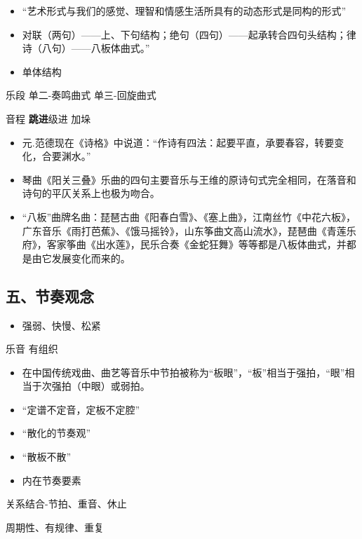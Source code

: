 \documentclass[
]{article}
\providecommand{\tightlist}{%
  \setlength{\itemsep}{0pt}\setlength{\parskip}{0pt}}
\begin{document}
\begin{itemize}
\tightlist
\item
  ``艺术形式与我们的感觉、理智和情感生活所具有的动态形式是同构的形式''
\item
  对联（两句）------上、下句结构；绝句（四句）------起承转合四句头结构；律诗（八句）------八板体曲式。''
\item
  单体结构
\end{itemize}

乐段 单二-奏鸣曲式 单三-回旋曲式

音程 \textbf{跳进}级进 加垛

\begin{itemize}
\tightlist
\item
  元.范德现在《诗格》中说道：``作诗有四法：起要平直，承要春容，转要变化，合要渊水。''
\item
  琴曲《阳关三叠》乐曲的四句主要音乐与王维的原诗句式完全相同，在落音和诗句的平仄关系上也极为吻合。
\item
  ``八板''曲牌名曲：琵琶古曲《阳春白雪》、《塞上曲》，江南丝竹《中花六板》，广东音乐《雨打芭蕉》、《饿马摇铃》，山东筝曲文高山流水》，琵琶曲《青莲乐府》，客家筝曲《出水莲》，民乐合奏《金蛇狂舞》等等都是八板体曲式，并都是由它发展变化而来的。
\end{itemize}

\subsection{五、节奏观念}\label{ux4e94ux8282ux594fux89c2ux5ff5}

\begin{itemize}
\tightlist
\item
  强弱、快慢、松紧
\end{itemize}

乐音 有组织

\begin{itemize}
\tightlist
\item
  在中国传统戏曲、曲艺等音乐中节拍被称为``板眼''，``板''相当于强拍，``眼''相当于次强拍（中眼）或弱拍。
\item
  ``定谱不定音，定板不定腔''
\item
  ``散化的节奏观''
\item
  ``散板不散''
\item
  内在节奏要素
\end{itemize}

关系结合-节拍、重音、休止

周期性、有规律、重复
\end{document}
